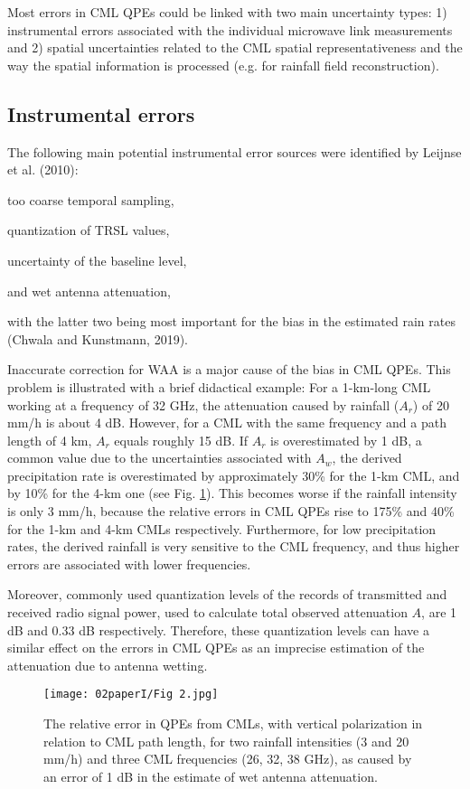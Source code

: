 \documentclass{ctuthesis}\usepackage[]{graphicx}\usepackage[]{color}
\begin{document}
Most errors in CML QPEs could be linked with two main uncertainty types: 1) instrumental errors associated with the individual microwave link measurements and 2) spatial uncertainties related to the CML spatial representativeness and the way the spatial information is processed (e.g. for rainfall field reconstruction).


\subsection{Instrumental errors} \label{InstErr}

The following main potential instrumental error sources were identified by Leijnse et al. (2010): 

too coarse temporal sampling, 

quantization of TRSL values, 

uncertainty of the baseline level, 

and wet antenna attenuation, 

with the latter two being most important for the bias in the estimated rain rates (Chwala and Kunstmann, 2019). 

Inaccurate correction for WAA is a major cause of the bias in CML QPEs. This problem is illustrated with a brief didactical example: For a 1-km-long CML working at a frequency of 32 GHz, the attenuation caused by rainfall ($A_r$) of 20 mm/h is about 4 dB. However, for a CML with the same frequency and a path length of 4 km, $A_r$ equals roughly 15 dB. If $A_r$ is overestimated by 1 dB, a common value due to the uncertainties associated with $A_w$, the derived precipitation rate is overestimated by approximately 30\% for the 1-km CML, and by 10\% for the 4-km one (see Fig. \ref{2fig2}). This becomes worse if the rainfall intensity is only 3 mm/h, because the relative errors in CML QPEs rise to 175\% and 40\% for the 1-km and 4-km CMLs respectively. Furthermore, for low precipitation rates, the derived rainfall is very sensitive to the CML frequency, and thus higher errors are associated with lower frequencies.

Moreover, commonly used quantization levels of the records of transmitted and received radio signal power, used to calculate total observed attenuation $A$, are 1 dB and 0.33 dB respectively. Therefore, these quantization levels can have a similar effect on the errors in CML QPEs as an imprecise estimation of the attenuation due to antenna wetting.

\begin{figure}[h]
\begin{center}
\texttt{[image: 02paperI/Fig 2.jpg]}
\caption{The relative error in QPEs from CMLs, with vertical polarization in relation to CML path length, for two rainfall intensities (3 and 20 mm/h) and three CML frequencies (26, 32, 38 GHz), as caused by an error of 1 dB in the estimate of wet antenna attenuation.} \label{2fig2}
\end{center}
\end{figure}
\end{document}
